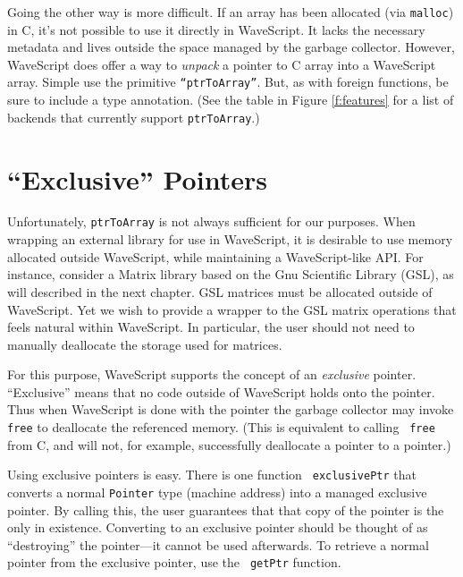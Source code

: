 Going the other way is more difficult.  If an array has been allocated
(via {\tt malloc}) in C, it's not possible to use it directly in
WaveScript.  It lacks the necessary metadata and lives outside the
space managed by the garbage collector.  However, WaveScript does
offer a way to {\em unpack} a pointer to C array into a WaveScript
array.  Simple use the primitive {\tt ``ptrToArray''}. But, as with
foreign functions, be sure to include a type annotation.  (See the
table in Figure \ref{f:features} for a list of backends that currently
support {\tt ptrToArray}.)

\section{``Exclusive'' Pointers}

Unfortunately, {\tt ptrToArray} is not always sufficient for our
purposes.  When wrapping an external library for use in WaveScript, it
is desirable to use memory allocated outside WaveScript, while
maintaining a WaveScript-like API.  For instance, consider a Matrix
library based on the Gnu Scientific Library (GSL), as will described in the
next chapter.  GSL matrices must be allocated outside of WaveScript.
Yet we wish to provide a wrapper to the GSL matrix operations that
feels natural within WaveScript.  In particular, the user should not
need to manually deallocate the storage used for matrices.

For this purpose, WaveScript supports the concept of an {\em
  exclusive} pointer.  ``Exclusive'' means that no code outside of
WaveScript holds onto the pointer.  Thus when WaveScript is done
with the pointer the garbage collector may invoke {\tt free} to
deallocate the referenced memory.  (This is equivalent to calling {\tt
  free} from C, and will not, for example, successfully deallocate a
  pointer to a pointer.)

Using exclusive pointers is easy.  There is one function {\tt
  exclusivePtr} that converts a normal {\tt Pointer} type (machine
  address) into a managed exclusive pointer.  By calling this, the
  user guarantees that that copy of the pointer is the only in
  existence.  Converting to an exclusive pointer should be thought of
  as ``destroying'' the pointer---it cannot be used afterwards.  To
  retrieve a normal pointer from the exclusive pointer, use the {\tt
  getPtr} function.  

